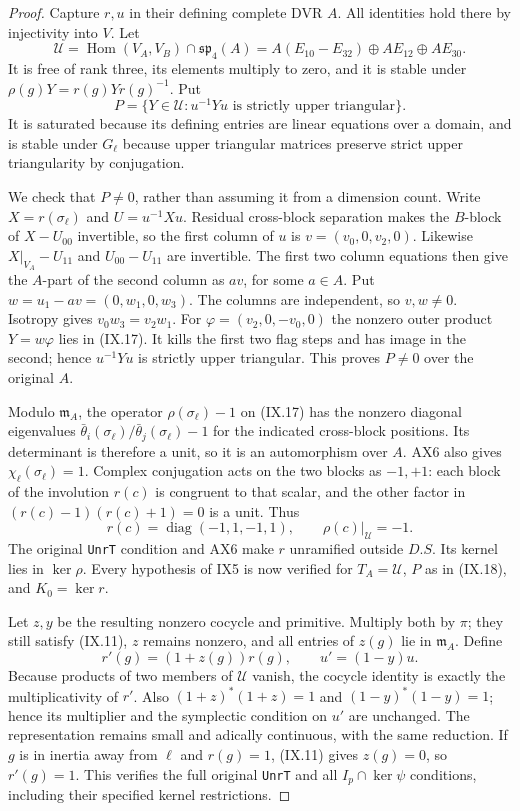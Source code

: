 \begin{proof}
Capture $r,u$ in their defining complete DVR $A$.
All identities hold there by injectivity into $V$.
Let
\[
 \mathcal U=\operatorname{Hom}(V_A,V_B)
                         \cap\mathfrak {sp}_4(A)
   =A(E_{10}-E_{32})\oplus AE_{12}\oplus AE_{30}.
 \tag{IX.17}
\]
It is free of rank three, its elements multiply to zero,
and it is stable under $\rho(g)Y=r(g)Yr(g)^{-1}$.
Put
\[
             P=\{Y\in\mathcal U:u^{-1}Yu
                                      \text{ is strictly upper triangular}\}.
 \tag{IX.18}
\]
It is saturated because its defining entries are linear
equations over a domain, and is stable under $G_\ell$
because upper triangular matrices preserve strict upper
triangularity by conjugation.

We check that $P\ne0$, rather than assuming it from a
dimension count.  Write $X=r(\sigma_\ell)$ and
$U=u^{-1}Xu$.  Residual cross-block separation makes
the $B$-block of $X-U_{00}$ invertible, so the first
column of $u$ is $v=(v_0,0,v_2,0)$.
Likewise $X|_{V_A}-U_{11}$ and $U_{00}-U_{11}$ are
invertible.  The first two column equations then give
the $A$-part of the second column as $a v$, for some
$a\in A$.  Put $w=u_1-av=(0,w_1,0,w_3)$.
The columns are independent, so $v,w\ne0$.
Isotropy gives $v_0w_3=v_2w_1$.
For $\varphi=(v_2,0,-v_0,0)$ the nonzero outer product
$Y=w\varphi$ lies in (IX.17).  It kills the first two
flag steps and has image in the second; hence
$u^{-1}Yu$ is strictly upper triangular.  This proves
$P\ne0$ over the original $A$.

Modulo $\mathfrak m_A$, the operator
$\rho(\sigma_\ell)-1$ on (IX.17) has the nonzero
diagonal eigenvalues
$\bar\theta_i(\sigma_\ell)/\bar\theta_j(\sigma_\ell)-1$
for the indicated cross-block positions.
Its determinant is therefore a unit, so it is an
automorphism over $A$.  AX6 also gives
$\chi_\ell(\sigma_\ell)=1$.
Complex conjugation acts on the two blocks as $-1,+1$:
each block of the involution $r(c)$ is congruent to that
scalar, and the other factor in $(r(c)-1)(r(c)+1)=0$
is a unit.  Thus
\[
                  r(c)=\operatorname{diag}(-1,1,-1,1),
                   \qquad \rho(c)|_{\mathcal U}=-1.
 \tag{IX.19}
\]
The original \texttt{UnrT} condition and AX6 make $r$
unramified outside $D.S$.  Its kernel lies in $\ker\rho$.
Every hypothesis of IX5 is now verified for $T_A=\mathcal U$,
$P$ as in (IX.18), and $K_0=\ker r$.

Let $z,y$ be the resulting nonzero cocycle and primitive.
Multiply both by $\pi$; they still satisfy (IX.11),
$z$ remains nonzero, and all entries of $z(g)$ lie in
$\mathfrak m_A$.  Define
\[
                       r'(g)=(1+z(g))r(g),
                       \qquad u'=(1-y)u.
 \tag{IX.20}
\]
Because products of two members of $\mathcal U$ vanish,
the cocycle identity is exactly the multiplicativity of
$r'$.  Also $(1+z)^*(1+z)=1$ and
$(1-y)^*(1-y)=1$; hence its multiplier and the symplectic
condition on $u'$ are unchanged.
The representation remains small and adically continuous,
with the same reduction.  If $g$ is in inertia away from
$\ell$ and $r(g)=1$, (IX.11) gives $z(g)=0$, so $r'(g)=1$.
This verifies the full original \texttt{UnrT} and all
$I_p\cap\ker\psi$ conditions, including their specified
kernel restrictions.


\end{proof}

